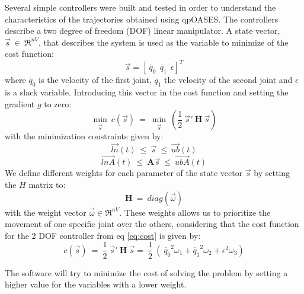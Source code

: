 Several simple controllers were built and tested in order to understand the characteristics of the trajectories obtained using qpOASES. The controllers describe a two degree of freedom (DOF) linear manipulator. A state vector, $\vec{s}\ \in\ \Re^{nV}$, that describes the system is used as the variable to minimize of the cost function:
\begin{equation}
 \vec{s} = [\dot{\ q_{0}} \ \ \dot{q_{1}} \ \ \epsilon ]^{T}
\end{equation}
where $\dot{q_{0}}$ is the velocity of the first joint, $\dot{q_{1}}$ the velocity of the second joint and $\epsilon$ is a slack variable. Introducing this vector in the cost function and setting the gradient $g$ to zero:
\begin{equation}
\underset{\vec{s}}{\min}\ c(\vec{s})\ =\  \underset{\vec{s}}{\min}\ \left( \frac{1}{2} \ \vec{s}' \ \textbf{H} \ \vec{s} \right)
\label{eq:cost}
\end{equation}
with the minimization constraints given by:
\begin{equation}
\vec{ln}(t)\ \leq\ \vec{s}\ \leq\ \vec{ub}(t)
\label{eq:constrain}
\end{equation}
\begin{equation}
\vec{lnA}(t)\ \leq\ \textbf{A} \vec{s}\ \leq\ \vec{ubA}(t)
\label{eq:constrainA}
\end{equation}
We define different weights for each parameter of the state vector $\vec{s}$ by setting the $H$ matrix to:
\begin{equation*}
\textbf{H}\ =\ diag(\vec{\omega})
\end{equation*}
with the weight vector $\vec{\omega} \in \Re^{nV}$. These weights allows us to prioritize the movement of one specific joint over the others, considering that the cost function for the 2 DOF controller from eq \ref{eq:cost} is given by:
\begin{equation}
c(\vec{s})\ =\ \frac{1}{2} \ \vec{s}' \ \textbf{H} \ \vec{s} =\ \frac{1}{2} \ (\ \dot{q_{0}}^{2}\omega_{1} + \dot{q_{1}}^{2}\omega_{2} + \epsilon^{2}\omega_{3})
\end{equation}

The software will try to minimize the cost of solving the problem by setting a higher value for the variables with a lower weight.

